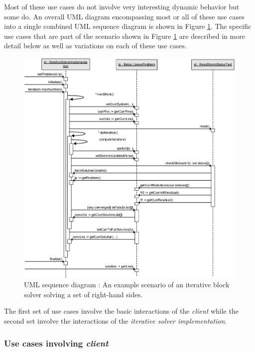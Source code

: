 \documentclass[pdf,ps2pdf,11pt]{SANDreport}
\begin{document}
Most of these use cases do not involve very interesting dynamic
behavior but some do.  An overall UML diagram encompassing most or all
of these use cases into a single combined UML sequence diagram is
shown in Figure {}\ref{belos:fig:BelosSequence}.  The specific use
cases that are part of the scenario shown in Figure
{}\ref{belos:fig:BelosSequence} are described in more detail below as
well as variations on each of these use cases.

{\bsinglespace
\begin{figure}
\begin{center}
\includegraphics*[scale=0.85]{BelosSequence}
\end{center}
\caption{
\label{belos:fig:BelosSequence}
UML sequence diagram : An example
scenario of an iterative block solver solving a set of right-hand
sides.}
\end{figure}
\esinglespace}

The first set of use cases involve the basic interactions of the
{}\textit{client} while the second set involve the interactions of the
{}\textit{iterative solver implementation}.

\subsubsection*{Use cases involving {}\textit{client}}
\end{document}
